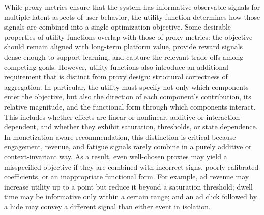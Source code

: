 \documentclass[manuscript,review,screen]{acmart}
\begin{document}
While proxy metrics ensure that the system has informative observable signals for multiple latent aspects of user behavior, the utility function determines how those signals are combined into a single optimization objective. Some desirable properties of utility functions overlap with those of proxy metrics: the objective should remain aligned with long-term platform value, provide reward signals dense enough to support learning, and capture the relevant trade-offs among competing goals. However, utility functions also introduce an additional requirement that is distinct from proxy design: structural correctness of aggregation. In particular, the utility must specify not only which components enter the objective, but also the direction of each component’s contribution, its relative magnitude, and the functional form through which components interact. This includes whether effects are linear or nonlinear, additive or interaction-dependent, and whether they exhibit saturation, thresholds, or state dependence. In monetization-aware recommendation, this distinction is critical because engagement, revenue, and fatigue signals rarely combine in a purely additive or context-invariant way. As a result, even well-chosen proxies may yield a misspecified objective if they are combined with incorrect signs, poorly calibrated coefficients, or an inappropriate functional form. For example, ad revenue may increase utility up to a point but reduce it beyond a saturation threshold; dwell time may be informative only within a certain range; and an ad click followed by a hide may convey a different signal than either event in isolation.

\end{document}

